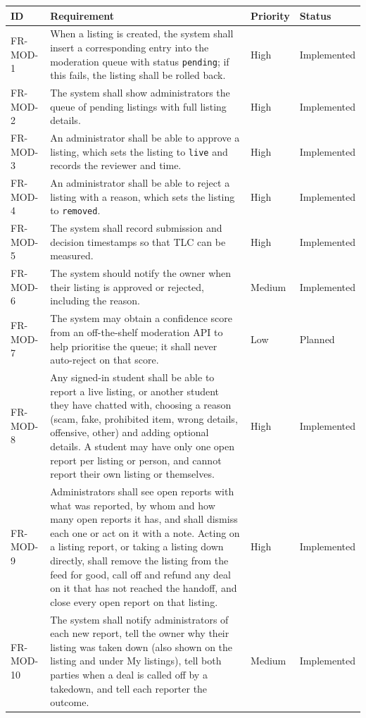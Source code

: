 \documentclass[11pt,a4paper]{scrreprt}
\newenvironment{reqtable}{%
  \small
  \begin{longtable}{>{\raggedright\arraybackslash\ttfamily\footnotesize}p{2.05cm} L{8.85cm} L{1.45cm} L{2.05cm}}
  \toprule
  \normalfont\normalsize\textbf{ID} & \textbf{Requirement} & \textbf{Priority} & \textbf{Status}\\
  \midrule\endhead
  \bottomrule\endfoot
}{\end{longtable}}
\newcommand{\impl}{Implemented}
\newcommand{\planned}{Planned}
\begin{document}
\begin{reqtable}
FR-MOD-1 & When a listing is created, the system shall insert a corresponding entry into the moderation queue with status \texttt{pending}; if this fails, the listing shall be rolled back. & High & \impl\\
FR-MOD-2 & The system shall show administrators the queue of pending listings with full listing details. & High & \impl\\
FR-MOD-3 & An administrator shall be able to approve a listing, which sets the listing to \texttt{live} and records the reviewer and time. & High & \impl\\
FR-MOD-4 & An administrator shall be able to reject a listing with a reason, which sets the listing to \texttt{removed}. & High & \impl\\
FR-MOD-5 & The system shall record submission and decision timestamps so that TLC can be measured. & High & \impl\\
FR-MOD-6 & The system should notify the owner when their listing is approved or rejected, including the reason. & Medium & \impl\\
FR-MOD-7 & The system may obtain a confidence score from an off-the-shelf moderation API to help prioritise the queue; it shall never auto-reject on that score. & Low & \planned\\
FR-MOD-8 & Any signed-in student shall be able to report a live listing, or another student they have chatted with, choosing a reason (scam, fake, prohibited item, wrong details, offensive, other) and adding optional details. A student may have only one open report per listing or person, and cannot report their own listing or themselves. & High & \impl\\
FR-MOD-9 & Administrators shall see open reports with what was reported, by whom and how many open reports it has, and shall dismiss each one or act on it with a note. Acting on a listing report, or taking a listing down directly, shall remove the listing from the feed for good, call off and refund any deal on it that has not reached the handoff, and close every open report on that listing. & High & \impl\\
FR-MOD-10 & The system shall notify administrators of each new report, tell the owner why their listing was taken down (also shown on the listing and under My listings), tell both parties when a deal is called off by a takedown, and tell each reporter the outcome. & Medium & \impl\\
\end{reqtable}
\end{document}
